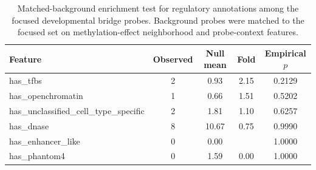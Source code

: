 \begin{table}[htbp]
\centering
\caption{Matched-background enrichment test for regulatory annotations among the focused developmental bridge probes. Background probes were matched to the focused set on methylation-effect neighborhood and probe-context features.}
\label{tab:matched_background_regulatory_enrichment}
\begin{tabular}{lcccc}
\hline
Feature & Observed & Null mean & Fold & Empirical $p$ \\
\hline
has\_tfbs & 2 & 0.93 & 2.15 & 0.2129 \\
has\_openchromatin & 1 & 0.66 & 1.51 & 0.5202 \\
has\_unclassified\_cell\_type\_specific & 2 & 1.81 & 1.10 & 0.6257 \\
has\_dnase & 8 & 10.67 & 0.75 & 0.9990 \\
has\_enhancer\_like & 0 & 0.00 &  & 1.0000 \\
has\_phantom4 & 0 & 1.59 & 0.00 & 1.0000 \\
\hline
\end{tabular}
\end{table}

